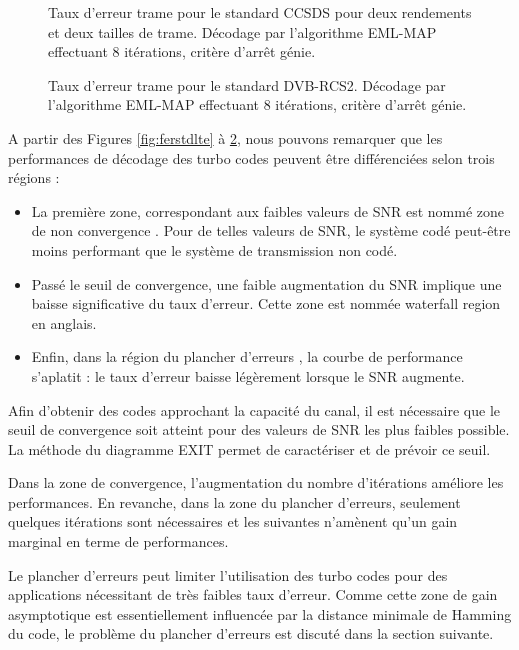 \begin{figure}[h]
\centering
				
		\caption{Taux d'erreur trame pour le standard CCSDS pour deux rendements et deux tailles de trame. 
		Décodage par l'algorithme EML-MAP effectuant 8 itérations, critère d’arrêt génie.}
		\label{fig:ferstdCCSDS}
\end{figure}

\begin{figure}[h]
\centering
				
		\caption{Taux d'erreur trame pour le standard DVB-RCS2. Décodage par l'algorithme EML-MAP effectuant 
		8 itérations, critère d’arrêt génie.}
		\label{fig:ferstdDVB2}
\end{figure}

\clearpage
A partir des Figures \ref{fig:ferstdlte} à \ref{fig:ferstdDVB2}, nous pouvons remarquer que les performances de décodage 
des turbo codes peuvent être différenciées selon trois régions :
\begin{itemize}
	\item La première zone, correspondant aux faibles valeurs de SNR est nommé \og zone de non convergence \fg. Pour de 
	telles valeurs de SNR, le système codé peut-être moins performant que le système de transmission non codé.
	\item Passé le seuil de convergence, une faible augmentation du SNR implique une baisse significative du taux d'erreur. 
	Cette zone est nommée \og waterfall region \fg  en anglais.
	\item Enfin, dans la région du \og plancher d'erreurs \fg, la courbe de performance s’aplatit : le taux d'erreur baisse 
	légèrement lorsque le SNR augmente.
\end{itemize}

Afin d'obtenir des codes approchant la capacité du canal, il est nécessaire que le seuil de convergence soit atteint pour des valeurs de SNR les plus faibles possible. La méthode du diagramme EXIT \cite{exitchart} permet de caractériser et de prévoir ce seuil. 

Dans la zone de convergence, l'augmentation du nombre d'itérations améliore les performances. En revanche, dans la zone 
du plancher d'erreurs, seulement quelques itérations sont nécessaires et les suivantes n'amènent qu'un gain marginal en 
terme de performances.

Le plancher d'erreurs peut limiter l'utilisation des turbo codes pour des applications nécessitant de très faibles taux 
d'erreur. Comme cette zone de gain asymptotique est essentiellement influencée par la distance minimale de Hamming du 
code, le problème du plancher d'erreurs est discuté dans la section suivante.

